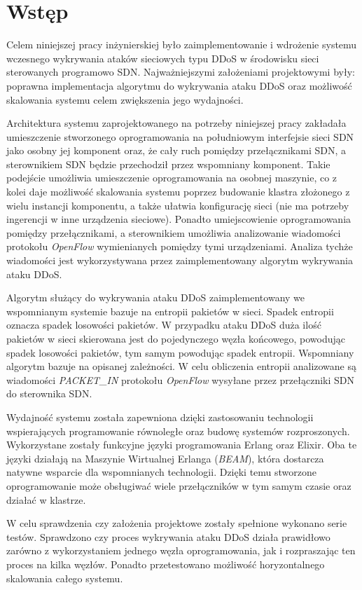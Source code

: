 \chapter{Wstęp}

Celem niniejszej pracy inżynierskiej było zaimplementowanie i wdrożenie systemu
wczesnego wykrywania ataków sieciowych typu DDoS w środowisku sieci sterowanych
programowo SDN. Najważniejszymi założeniami projektowymi były: poprawna
implementacja algorytmu do wykrywania ataku DDoS oraz możliwość skalowania
systemu celem zwiększenia jego wydajności.

Architektura systemu zaprojektowanego na potrzeby niniejszej pracy zakładała
umieszczenie stworzonego oprogramowania na południowym interfejsie sieci SDN
jako osobny jej komponent oraz, że cały ruch pomiędzy przełącznikami SDN, a
sterownikiem SDN będzie przechodził przez wspomniany komponent. Takie podejście
umożliwia umieszczenie oprogramowania na osobnej maszynie, co z kolei daje
możliwość skalowania systemu poprzez budowanie klastra złożonego z wielu
instancji komponentu, a także ułatwia konfigurację sieci (nie ma potrzeby
ingerencji w inne urządzenia sieciowe). Ponadto umiejscowienie oprogramowania
pomiędzy przełącznikami, a sterownikiem umożliwia analizowanie wiadomości
protokołu \textit{OpenFlow} wymienianych pomiędzy tymi urządzeniami. Analiza
tychże wiadomości jest wykorzystywana przez zaimplementowany algorytm wykrywania
ataku DDoS.

Algorytm służący do wykrywania ataku DDoS zaimplementowany we wspomnianym
systemie bazuje na entropii pakietów w sieci. Spadek entropii oznacza spadek
losowości pakietów. W przypadku ataku DDoS duża ilość pakietów w sieci
skierowana jest do pojedynczego węzła końcowego, powodując spadek losowości
pakietów, tym samym powodując spadek entropii. Wspomniany algorytm bazuje na
opisanej zależności. W celu obliczenia entropii analizowane są wiadomości
\textit{PACKET\_IN} protokołu \textit{OpenFlow} wysyłane przez przełączniki SDN
do sterownika SDN.

Wydajność systemu została zapewniona dzięki zastosowaniu technologii
wspierających programowanie równoległe oraz budowę systemów rozproszonych.
Wykorzystane zostały funkcyjne języki programowania Erlang oraz Elixir. Oba te
języki działają na Maszynie Wirtualnej Erlanga (\textit{BEAM}), która dostarcza
natywne wsparcie dla wspomnianych technologii. Dzięki temu stworzone
oprogramowanie może obsługiwać wiele przełączników w tym samym czasie oraz
działać w klastrze.

W celu sprawdzenia czy założenia projektowe zostały spełnione wykonano serie
testów. Sprawdzono czy proces wykrywania ataku DDoS działa prawidłowo zarówno z
wykorzystaniem jednego węzła oprogramowania, jak i rozpraszając ten proces na
kilka węzłów. Ponadto przetestowano możliwość horyzontalnego skalowania całego
systemu.